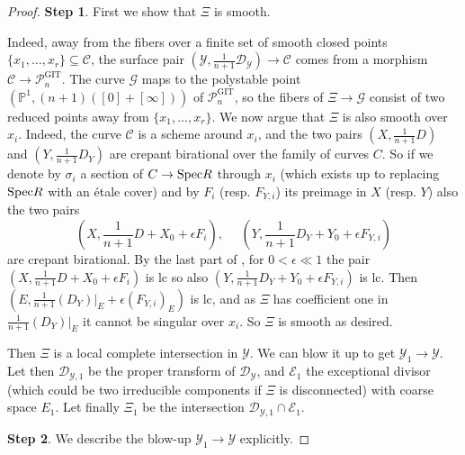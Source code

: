 \documentclass[a4paper,12pt]{amsart}
\DeclareMathOperator{\GIT}{GIT}
\newcommand{\bP}{{\mathbb P}}
\newcommand{\sY}{{\mathscr{Y}}}
\newcommand{\sP}{{\mathscr{P}}}
\newcommand{\sD}{{\mathscr{D}}}
\newcommand{\sC}{{\mathscr{C}}}
\newcommand{\cG}{{\mathcal{G}}}
\newcommand\spec{\text{\rm Spec}}
\newcommand\cE{{\mathcal{E}}}
\theoremstyle{definition}
\theoremstyle{remark}
\begin{document}
\begin{proof}
    \textbf{Step 1}. First we show that $\Xi$ is smooth.
    
    Indeed, away from the fibers over a finite set of smooth closed points $\{x_1,\ldots,x_r\}\subseteq \sC$, the surface pair $(\sY,\frac{1}{n+1}\sD_\sY)\to \sC$ comes from a morphism $\sC\to \sP_n^{\GIT}$.
    The curve $\cG$ maps to the polystable point $(\bP^1,(n+1)([0]+[\infty]))$ of $\sP_n^{\GIT}$, so the fibers of $\Xi\to \cG$ consist of two reduced points away from $\{x_1,\ldots,x_r\}$. We now argue that $\Xi$ is also smooth over $x_i$. Indeed, the curve $\sC$ is a scheme around $x_i$, and the two pairs $(X,\frac{1}{n+1}D)$ and $(Y,\frac{1}{n+1}D_Y)$ are crepant birational over the family of curves $C$. So if we denote by $\sigma_i$ a section of $C\to \spec R$ through $x_i$ (which exists up to replacing $\spec R$ with an \'etale cover) and by $F_i$ (resp. $F_{Y,i}$) its preimage in $X$ (resp. $Y$) also the two pairs $$\textstyle (X,\frac{1}{n+1}D+X_0+\epsilon F_i), \ \ \ \ \ \ (Y,\frac{1}{n+1}D_Y+Y_0+\epsilon F_{Y,i})$$ are crepant birational. By the last part of , for $0<\epsilon \ll 1$ the pair $(X,\frac{1}{n+1}D+X_0+\epsilon F_i)$ is lc so also $(Y,\frac{1}{n+1}D_Y+Y_0+\epsilon F_{Y,i})$ is lc. Then $(E,\frac{1}{n+1}(D_Y)|_{E}+\epsilon (F_{Y,i})_{E})$
    is lc, and as $\Xi$ has coefficient one in $\frac{1}{n+1}(D_Y)|_{E}$ it cannot be singular over $x_i$. So $\Xi$ is smooth as desired.

    Then $\Xi$ is a local complete intersection in $\sY$. We can blow it up to get $\sY_1\to \sY$. Let then $\sD_{\sY,1}$ be the proper transform of $\sD_\sY$, and $\cE_1$ the exceptional divisor (which could be two irreducible components if $\Xi$ is disconnected) with coarse space $E_1$. Let finally $\Xi_1$ be the intersection $\sD_{\sY,1}\cap \cE_1$.
    
    \textbf{Step 2}. We describe the blow-up $\sY_1\to \sY$ explicitly.
    

\end{proof}
\end{document}
